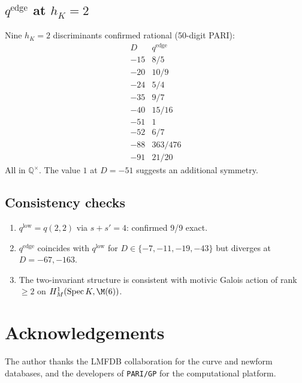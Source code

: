 \documentclass[11pt,a4paper]{amsart}
\theoremstyle{plain}
\theoremstyle{definition}
\newcommand{\Q}{\mathbb{Q}}
\newcommand{\Spec}{\mathrm{Spec}\,}
\begin{document}
\subsection{$q^{\text{edge}}$ at $h_K=2$}
Nine $h_K=2$ discriminants confirmed rational (50-digit PARI):
\[
\begin{array}{c|c}
  D & q^{\text{edge}} \\ \hline
  -15 & 8/5 \\
  -20 & 10/9 \\
  -24 & 5/4 \\
  -35 & 9/7 \\
  -40 & 15/16 \\
  -51 & 1 \\
  -52 & 6/7 \\
  -88 & 363/476 \\
  -91 & 21/20
\end{array}
\]
All in $\Q^{\times}$. The value $1$ at $D=-51$ suggests an additional symmetry.

\subsection{Consistency checks}
\begin{enumerate}
  \item $q^{\text{low}}=q(2,2)$ via $s+s'=4$: confirmed 9/9 exact.
  \item $q^{\text{edge}}$ coincides with $q^{\text{low}}$ for $D\in\{-7,-11,-19,-43\}$ but diverges at $D=-67,-163$.
  \item The two-invariant structure is consistent with motivic Galois action of rank $\ge 2$ on $H^1_M(\Spec K,\M(6))$.
\end{enumerate}

\section*{Acknowledgements}

The author thanks the LMFDB collaboration \cite{LMFDB} for
the curve and newform databases, and the developers of \texttt{PARI/GP}
for the computational platform.
\end{document}
